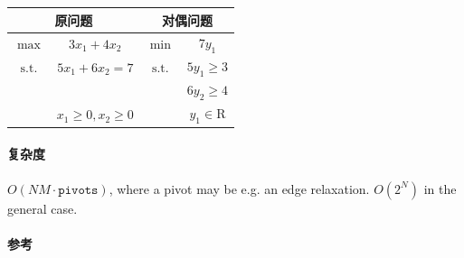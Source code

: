 \begin{tabular}{cc|cc}
    \hline
    \multicolumn{2}{c}{原问题} & \multicolumn{2}{c}{对偶问题}                                            \\
    \hline
    \(\max\)                & \(3x_1+4x_2\)            & \(\min\)          & \(7y_1\)             \\
    \(\textrm{s.t.}\)       & \(5x_1+6x_2=7\)          & \(\textrm{s.t.}\) & \(5y_1\geq 3\)       \\
                            &                          &                   & \(6y_2\geq 4\)       \\
                            & \(x_1\geq 0,x_2\geq 0\)  &                   & \(y_1\in\mathrm{R}\) \\
    \hline
\end{tabular}

\paragraph{复杂度}

\(O(NM \cdot \texttt{pivots})\), where a pivot may be e.g. an edge relaxation. \(O(2^N)\) in the general case.

\paragraph{参考} \cite{bqi343cp}


